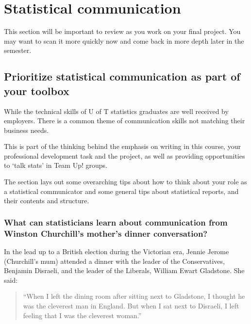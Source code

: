 \documentclass[
  openany]{book}
\begin{document}
\hypertarget{statistical-communication}{%
\section{Statistical communication}\label{statistical-communication}}

This section will be important to review as you work on your final project. You may want to scan it more quickly now and come back in more depth later in the semester.

\hypertarget{prioritize-statistical-communication-as-part-of-your-toolbox}{%
\subsection{Prioritize statistical communication as part of your toolbox}\label{prioritize-statistical-communication-as-part-of-your-toolbox}}

While the technical skills of U of T statistics graduates are well received by employers. There is a common theme of communication skills not matching their business needs.

This is part of the thinking behind the emphasis on writing in this course, your professional development task and the project, as well as providing opportunities to `talk stats' in Team Up! groups.

The section lays out some overarching tips about how to think about your role as a statistical communicator and some general tips about statistical reports, and their contents and structure.

\hypertarget{what-can-statisticians-learn-about-communication-from-winston-churchills-mothers-dinner-conversation}{%
\subsubsection{What can statisticians learn about communication from Winston Churchill's mother's dinner conversation?}\label{what-can-statisticians-learn-about-communication-from-winston-churchills-mothers-dinner-conversation}}

In the lead up to a British election during the Victorian era, Jennie Jerome (Churchill's mum) attended a dinner with the leader of the Conservatives, Benjamin Disraeli, and the leader of the Liberals, William Ewart Gladstone. She said:

\begin{quote}
``When I left the dining room after sitting next to Gladstone, I thought he was the cleverest man in England. But when I sat next to Disraeli, I left feeling that I was the cleverest woman.''
\end{quote}
\end{document}
